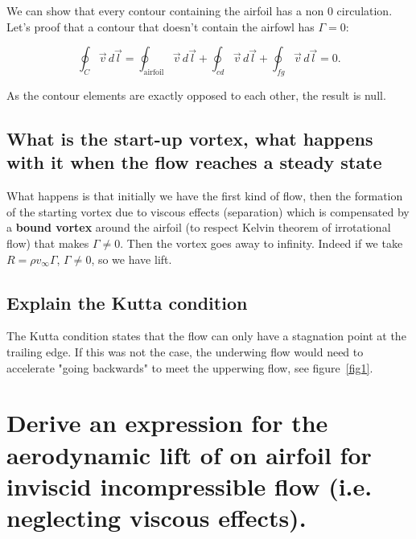 \documentclass[british,french,11pt, a4paper, openany]{article}
\begin{document}
We can show that every contour containing the airfoil has a non 0 circulation. Let's proof that a contour that doesn't contain the airfowl has $\Gamma =0$: 

\begin{equation}
\oint _{C} \vec{v}\, d\vec{l} = \oint _{\mbox{airfoil}} \vec{v}\, d\vec{l} + \oint _{cd} \vec{v}\, d\vec{l} + \oint _{fg} \vec{v}\, d\vec{l} = 0. 
\end{equation}

As the contour elements are exactly opposed to each other, the result is null. 

\subsection{What is the start-up vortex, what happens with it when the flow reaches a
	steady state}
What happens is that initially we have the first kind of flow, then the formation of the starting vortex due to viscous effects (separation) which is compensated by a \textbf{bound vortex} around the airfoil (to respect Kelvin theorem of irrotational flow) that makes $\Gamma \neq 0$. Then the vortex goes away to infinity. Indeed if we take $R = \rho v_\infty \Gamma$, $\Gamma \neq 0$, so we have lift. 
\subsection{Explain the Kutta condition}
The Kutta condition states that the flow can only have a stagnation point at the trailing edge. If this was not the case, the underwing flow would need to accelerate "going backwards" to meet the upperwing flow, see figure~\ref{fig1}.


\section{Derive an expression for the aerodynamic lift of on airfoil for inviscid
	incompressible flow (i.e. neglecting viscous effects).}
\end{document}
